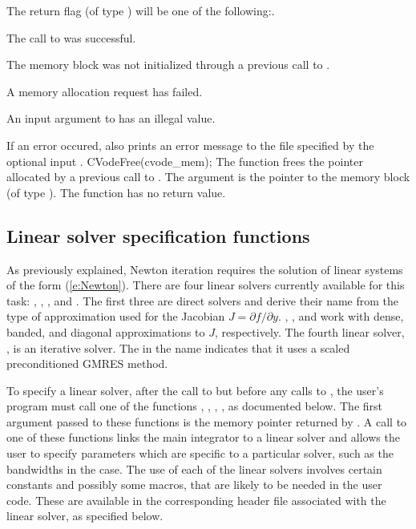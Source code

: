 {
  The return flag  (of type ) will be one of the following:.
  \begin{args}
  \item[\Id{SUCCESS}]
    The call to  was successful.
  \item[\Id{CVM\_NO\_MEM}] 
    The {\cvode} memory block was not initialized through a previous call to .
  \item[\Id{CVM\_MEM\_FAIL}] 
    A memory allocation request has failed.
  \item[\Id{CVM\_ILL\_INPUT}] 
    An input argument to  has an illegal value.
  \end{args}
}
{
  If an error occured,  also prints an error message to the
  file specified by the optional input .
}
{
  CVodeFree(cvode\_mem);
}
{
  The function  frees the pointer allocated by
  a previous call to .
}
{
  The argument is the pointer to the {\cvode} memory block (of type ).
}
{
  The function  has no return value.
}
{}
\subsection{Linear solver specification functions}\label{sss:lin_solv_init}

As previously explained, Newton iteration requires the solution of
linear systems of the form (\ref{e:Newton}).  There are four {\cvode} linear
solvers currently available for this task: {\cvdense}, {\cvband}, {\cvdiag},
and {\cvspgmr}.  The first three are direct solvers and derive their name
from the type of approximation used for the Jacobian 
$J = \partial{f}/\partial{y}$.  {\cvdense}, {\cvband}, and {\cvdiag} work with
dense, banded, and diagonal approximations to $J$, respectively.  The
fourth {\cvode} linear solver, {\cvspgmr}, is an iterative solver.  The {\spgmr}
in the name indicates that it uses a scaled preconditioned
GMRES method.

To specify a {\cvode} linear solver, after the call to 
but before any calls to , the user's program must call one
of the functions , , , ,
as documented below. The first argument passed to these functions is the {\cvode}
memory pointer returned by .  A call to one of these
functions links the main {\cvode} integrator to a linear solver and
allows the user to specify parameters which are specific to a
particular solver, such as the bandwidths in the {\cvband} case.
The use of each of the linear solvers involves certain constants and possibly 
some macros, that are likely to be needed in the user code.  These are
available in the corresponding header file associated with the linear
solver, as specified below.

